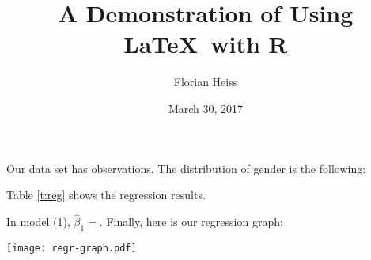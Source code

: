 \documentclass[fontsize=12pt,DIV=30]{scrartcl}
\begin{document}
\title{A Demonstration of Using \LaTeX\ with R}
\author{Florian Heiss}
\date{March 30, 2017}
\maketitle
\thispagestyle{empty}

Our data set has  observations. 
The distribution of gender is the following:


Table \ref{t:reg} shows the regression results.


In model (1), $\hat\beta_1=$. 
Finally, here is our regression graph:

\centering\texttt{[image: regr-graph.pdf]}
\end{document}
